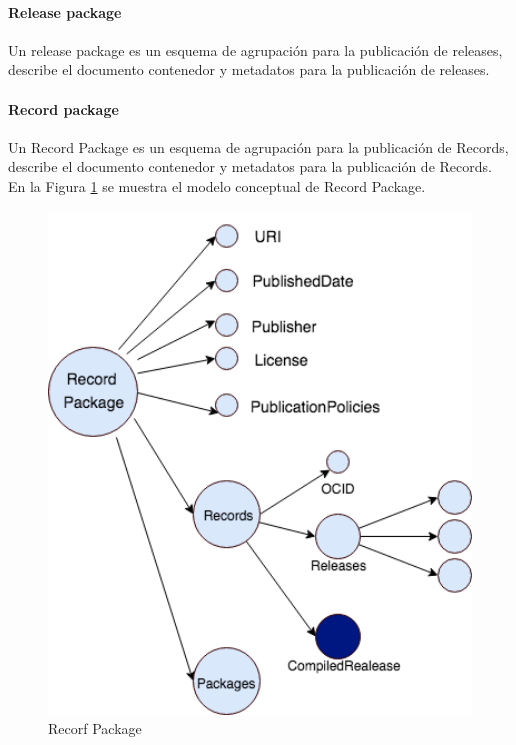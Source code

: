 \paragraph{Release package}
Un release package es un esquema de agrupación para la publicación de releases, describe el documento contenedor y metadatos para la publicación de releases.

\paragraph{Record package}

Un Record Package es un esquema de agrupación para la publicación de Records, describe el documento contenedor y metadatos para la publicación de Records. En la Figura \ref{img:Record Package} se muestra el modelo conceptual de Record Package.



\begin{figure}[h!]
    \centering
    \includegraphics[width=150mm]{figuras/Diagramas-RecordPackage.png}
    \caption{Recorf Package}
    \label{img:Record Package}
\end{figure}


